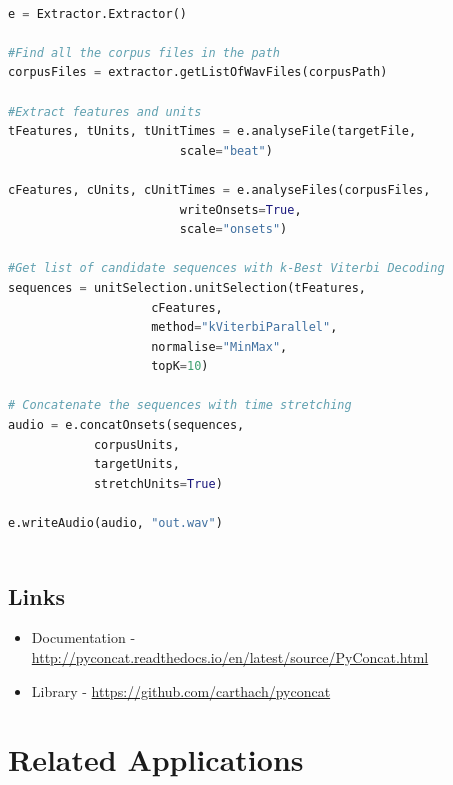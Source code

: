 
\small
\begin{lstlisting}[language=Python]

e = Extractor.Extractor()

#Find all the corpus files in the path
corpusFiles = extractor.getListOfWavFiles(corpusPath)

#Extract features and units
tFeatures, tUnits, tUnitTimes = e.analyseFile(targetFile, 
						scale="beat")
						
cFeatures, cUnits, cUnitTimes = e.analyseFiles(corpusFiles, 
						writeOnsets=True, 
						scale="onsets")

#Get list of candidate sequences with k-Best Viterbi Decoding 
sequences = unitSelection.unitSelection(tFeatures, 
					cFeatures, 
					method="kViterbiParallel", 
					normalise="MinMax", 
					topK=10)

# Concatenate the sequences with time stretching
audio = e.concatOnsets(sequences, 
			corpusUnits, 
			targetUnits, 
			stretchUnits=True)	
							   
e.writeAudio(audio, "out.wav")
 
\end{lstlisting}

\normalsize

\section{Links}

\begin{itemize}
  \item Documentation - \url{http://pyconcat.readthedocs.io/en/latest/source/PyConcat.html}
  \item Library - \url{https://github.com/carthach/pyconcat}
\end{itemize}

\chapter{Related Applications}
\label{app:related_applications}

